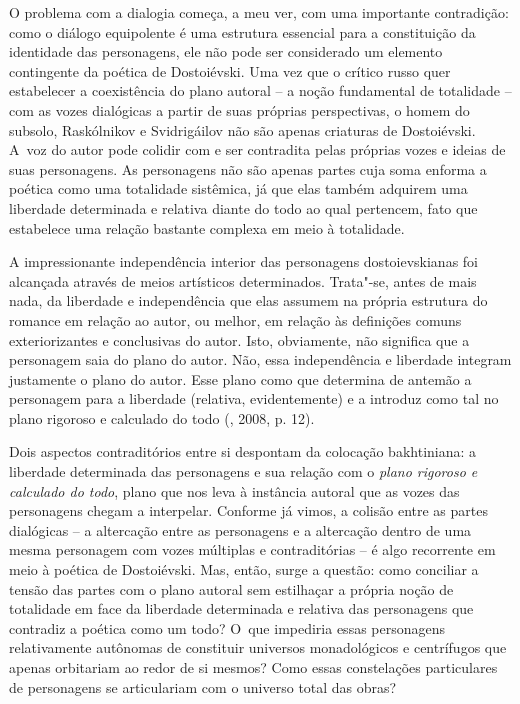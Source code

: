 {O problema com a dialogia começa, a meu ver, com uma importante
contradição: como o diálogo equipolente é uma estrutura essencial para a
constituição da identidade das personagens, ele não pode ser considerado
um elemento contingente da poética de Dostoiévski. Uma vez que o crítico
russo quer estabelecer a coexistência do plano autoral -- a noção
fundamental de totalidade -- com as vozes dialógicas a partir de suas
próprias perspectivas, o homem do subsolo, Raskólnikov e Svidrigáilov
não são apenas criaturas de Dostoiévski. A~voz do autor pode colidir com
e ser contradita pelas próprias vozes e ideias de suas personagens. As
personagens não são apenas partes cuja soma enforma a poética como uma
totalidade sistêmica, já que elas também adquirem uma liberdade
determinada e relativa diante do todo ao qual pertencem, fato que
estabelece uma relação bastante complexa em meio à totalidade.

A impressionante independência interior das personagens dostoievskianas
foi alcançada através de meios artísticos determinados. Trata"-se, antes
de mais nada, da liberdade e independência que elas assumem na própria
estrutura do romance em relação ao autor, ou melhor, em relação às
definições comuns exteriorizantes e conclusivas do autor. Isto,
obviamente, não significa que a personagem saia do plano do autor. Não,
essa independência e liberdade integram justamente o plano do autor.
Esse plano como que determina de antemão a personagem para a liberdade
(relativa, evidentemente) e a introduz como tal no plano rigoroso e
calculado do todo (, 2008, p. 12).

Dois aspectos contraditórios entre si despontam da colocação
bakhtiniana: a liberdade determinada das personagens e sua relação com o
\emph{plano rigoroso e calculado do todo}, plano que nos leva à
instância autoral que as vozes das personagens chegam a interpelar.
Conforme já vimos, a colisão entre as partes dialógicas -- a altercação
entre as personagens e a altercação dentro de uma mesma personagem com
vozes múltiplas e contraditórias -- é algo recorrente em meio à poética
de Dostoiévski. Mas, então, surge a questão: como conciliar a tensão das
partes com o plano autoral sem estilhaçar a própria noção de totalidade
em face da liberdade determinada e relativa das personagens que
contradiz a poética como um todo? O~que impediria essas personagens
relativamente autônomas de constituir universos monadológicos e
centrífugos que apenas orbitariam ao redor de si mesmos? Como essas
constelações particulares de personagens se articulariam com o universo
total das obras?

}
